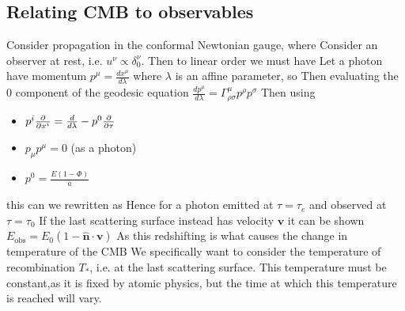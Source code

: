 \documentclass{article}
\begin{document}
\subsection{Relating CMB to observables}
Consider propagation in the conformal Newtonian gauge, where
Consider an observer at rest, i.e. $u^\nu \propto \delta^\nu_0$. Then to linear order we must have 
Let a photon have momentum $p^\mu = \frac{d x^\mu}{d\lambda}$ where $\lambda$ is an affine parameter, so  
Then evaluating the 0 component of the geodesic equation $\frac{dp^\mu}{d\lambda} = \Gamma^\mu_{\rho\sigma} p^\rho p^\sigma$
Then using 
\begin{itemize}
    \item $p^i \frac{\partial}{\partial x^i} = \frac{d}{d\lambda} - p^0 \frac{\partial}{\partial\tau}$
    \item $p_\mu p^\mu =0$ (as a photon)
    \item $p^ 0 = \frac{E(1-\Phi)}{a}$
\end{itemize}
this can we rewritten as  
Hence for a photon emitted at $\tau = \tau_e$ and observed at $\tau = \tau_0$ 
If the last scattering surface instead has velocity $\bm{v}$ it can be shown $E_{\text{obs}} = E_0 ( 1- \hat{\bm{n}} \cdot \bm{v} ) $
As this redshifting is what causes the change in temperature of the CMB
We specifically want to consider the temperature of recombination $T_\ast$, i.e. at the last scattering surface. This temperature must be constant,as it is fixed by atomic physics, but the time at which this temperature is reached will vary.
\end{document}
